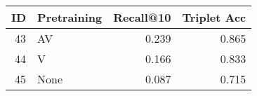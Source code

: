\begin{tabular}{rlrr}
\toprule
 ID & Pretraining &  Recall@10 &  Triplet Acc \\
\midrule
 43 &          AV &      0.239 &        0.865 \\
 44 &           V &      0.166 &        0.833 \\
 45 &        None &      0.087 &        0.715 \\
\bottomrule
\end{tabular}
